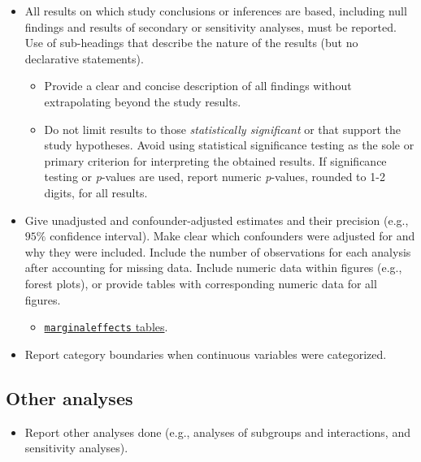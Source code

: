 \documentclass[
  letterpaper,
  DIV=11,
  numbers=noendperiod]{scrartcl}
\providecommand{\tightlist}{%
  \setlength{\itemsep}{0pt}\setlength{\parskip}{0pt}}\usepackage{longtable,booktabs,array}
\begin{document}
\begin{itemize}
\tightlist
\item
  All results on which study conclusions or inferences are based,
  including null findings and results of secondary or sensitivity
  analyses, must be reported. Use of sub-headings that describe the
  nature of the results (but no declarative statements).

  \begin{itemize}
  \tightlist
  \item
    Provide a clear and concise description of all findings without
    extrapolating beyond the study results.
  \item
    Do not limit results to those \emph{statistically significant} or
    that support the study hypotheses. Avoid using statistical
    significance testing as the sole or primary criterion for
    interpreting the obtained results. If significance testing or
    \emph{p}-values are used, report numeric \emph{p}-values, rounded to
    1-2 digits, for all results.
  \end{itemize}
\item
  Give unadjusted and confounder-adjusted estimates and their precision
  (e.g., \(95\%\) confidence interval). Make clear which confounders
  were adjusted for and why they were included. Include the number of
  observations for each analysis after accounting for missing data.
  Include numeric data within figures (e.g., forest plots), or provide
  tables with corresponding numeric data for all figures.

  \begin{itemize}
  \tightlist
  \item
    \href{https://vincentarelbundock.github.io/marginaleffects/articles/tables.html}{\texttt{marginaleffects}
    tables}.
  \end{itemize}
\item
  Report category boundaries when continuous variables were categorized.
\end{itemize}

\hypertarget{sec-res-other}{%
\subsection{Other analyses}\label{sec-res-other}}

\begin{itemize}
\tightlist
\item
  Report other analyses done (e.g., analyses of subgroups and
  interactions, and sensitivity analyses).
\end{itemize}
\end{document}
